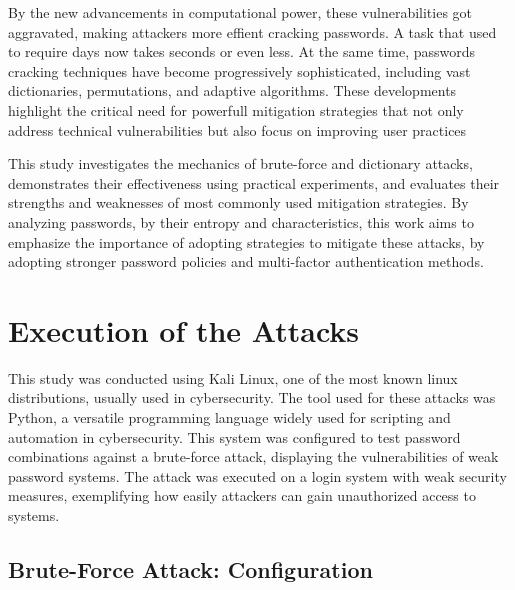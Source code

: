 \documentclass{comjnl}
\begin{document}
By the new advancements in computational power, these vulnerabilities got aggravated, making attackers more effient cracking passwords. A task that used to require days now takes seconds or even less. At the same time, passwords cracking techniques have become progressively sophisticated, including vast dictionaries, permutations, and adaptive algorithms. These developments highlight the critical need for powerfull mitigation strategies that not only address technical vulnerabilities but also focus on improving user practices 

This study investigates the mechanics of brute-force and dictionary attacks, demonstrates their effectiveness using practical experiments, and evaluates their strengths and weaknesses of most commonly used mitigation strategies. By analyzing passwords, by their entropy and characteristics, this work aims to emphasize the importance of adopting strategies to mitigate these attacks, by adopting stronger password policies and multi-factor authentication methods.

\section{Execution of the Attacks}

This study was conducted using Kali Linux, one of the most known linux distributions, usually used in cybersecurity. The tool used for these attacks was Python, a versatile programming language widely used for scripting and automation in cybersecurity. This system was configured to test password combinations against a brute-force attack, displaying the vulnerabilities of weak password systems. The attack was executed on a login system with weak security measures, exemplifying how easily attackers can gain unauthorized access to systems. 

\subsection{Brute-Force Attack: Configuration}
\end{document}
